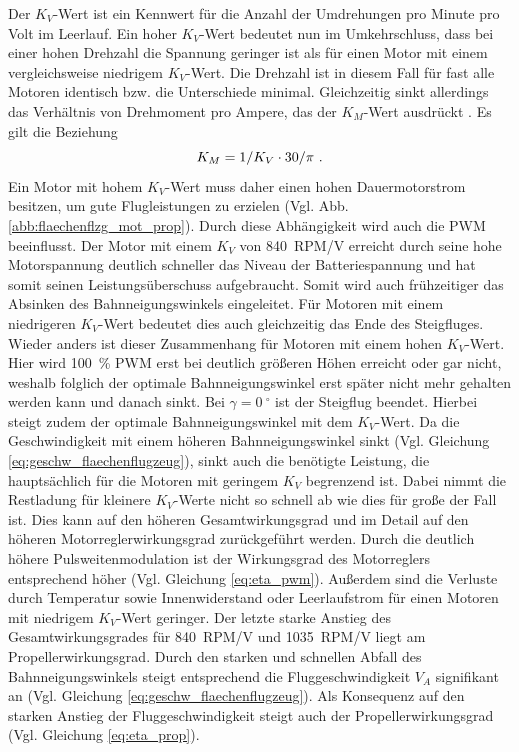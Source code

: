 Der \ensuremath{K_V}-Wert ist ein Kennwert für die Anzahl der Umdrehungen pro Minute pro Volt im Leerlauf. Ein hoher \ensuremath{K_V}-Wert bedeutet nun im Umkehrschluss, dass bei einer hohen Drehzahl die Spannung geringer ist als für einen Motor mit einem vergleichsweise niedrigem \ensuremath{K_V}-Wert. Die Drehzahl ist in diesem Fall für fast alle Motoren identisch bzw. die Unterschiede minimal. Gleichzeitig sinkt allerdings das Verhältnis von Drehmoment pro Ampere, das der \ensuremath{K_M}-Wert ausdrückt  \cite[S.35 und S.42-43]{Buchi.2013}. Es gilt die Beziehung
\begin{equation}
	K_M = 1/K_V\cdot 30/\pi ~\text{.}
\end{equation}
Ein Motor mit hohem \ensuremath{K_V}-Wert muss daher einen hohen Dauermotorstrom besitzen, um gute Flugleistungen zu erzielen (Vgl. Abb. \ref{abb:flaechenflzg_mot_prop}). Durch diese Abhängigkeit wird auch die PWM beeinflusst. Der Motor mit einem \ensuremath{K_V} von \SI{840}{RPM/V} erreicht durch seine hohe Motorspannung deutlich schneller das Niveau der Batteriespannung und hat somit seinen Leistungsüberschuss aufgebraucht. Somit wird auch frühzeitiger das Absinken des Bahnneigungswinkels eingeleitet. Für Motoren mit einem niedrigeren \ensuremath{K_V}-Wert bedeutet dies auch gleichzeitig das Ende des Steigfluges. Wieder anders ist dieser Zusammenhang für Motoren mit einem hohen \ensuremath{K_V}-Wert. Hier wird \SI{100}{\%} PWM erst bei deutlich größeren Höhen erreicht oder gar nicht, weshalb folglich der optimale Bahnneigungswinkel erst später nicht mehr gehalten werden kann und danach sinkt. Bei \ensuremath{\gamma = \SI{0}{^\circ}} ist der Steigflug beendet. Hierbei steigt zudem der optimale Bahnneigungswinkel mit dem \ensuremath{K_V}-Wert. Da die Geschwindigkeit mit einem höheren Bahnneigungswinkel sinkt (Vgl. Gleichung \ref{eq:geschw_flaechenflugzeug}), sinkt auch die benötigte Leistung, die hauptsächlich für die Motoren mit geringem \ensuremath{K_V} begrenzend ist. Dabei nimmt die Restladung für kleinere \ensuremath{K_V}-Werte nicht so schnell ab wie dies für große der Fall ist. Dies kann auf den höheren Gesamtwirkungsgrad und im Detail auf den höheren Motorreglerwirkungsgrad zurückgeführt werden. Durch die deutlich höhere Pulsweitenmodulation ist der Wirkungsgrad des Motorreglers entsprechend höher (Vgl. Gleichung \ref{eq:eta_pwm}). Außerdem sind die Verluste durch Temperatur  sowie Innenwiderstand oder Leerlaufstrom für einen Motoren mit niedrigem \ensuremath{K_V}-Wert geringer. Der letzte starke Anstieg des Gesamtwirkungsgrades für \SI{840}{RPM/V} und \SI{1035}{RPM/V} liegt am Propellerwirkungsgrad. Durch den starken und schnellen Abfall des Bahnneigungswinkels steigt entsprechend die Fluggeschwindigkeit \ensuremath{V_A} signifikant an (Vgl. Gleichung \ref{eq:geschw_flaechenflugzeug}). Als Konsequenz auf den starken Anstieg der Fluggeschwindigkeit steigt auch der Propellerwirkungsgrad (Vgl. Gleichung \ref{eq:eta_prop}). \\

